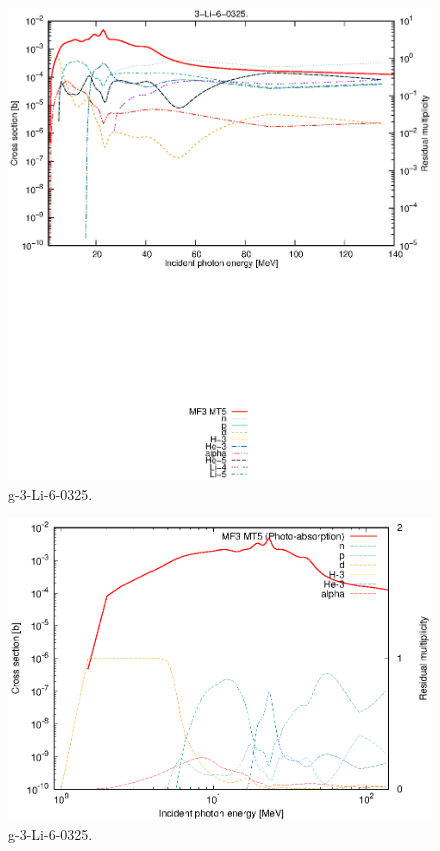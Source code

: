 \begin{figure}
 \includegraphics[width=\linewidth]{eps/g_3-Li-6_0325.eps}
  \caption{g-3-Li-6-0325.}
\end{figure}
\newpage \clearpage

\begin{figure}
 \includegraphics[width=\linewidth]{eps-log/g_3-Li-6_0325.eps}
 \caption{g-3-Li-6-0325.}
\end{figure}
\newpage \clearpage

